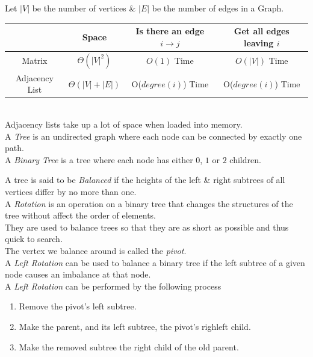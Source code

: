 \documentclass[11pt,a4paper]{article}
\begin{document}
Let $|V|$ be the number of vertices \& $|E|$ be the number of edges in a Graph.\\
\begin{tabular}{|c|c|c|c|}
\hline
&Space&Is there an edge $i\to j$&Get all edges leaving $i$\\
\hline
Matrix&$\Theta(|V|^2)$&$O(1)$ Time& $O(|V|)$ Time\\
Adjacency List&$\Theta(|V|+|E|)$& O($degree(i)$) Time& O($degree(i)$) Time\\
\hline
\end{tabular}\\
\nb Adjacency lists take up a lot of space when loaded into memory.\\

A \textit{Tree} is an undirected graph where each node can be connected by exactly one path.\\

A \textit{Binary Tree} is a tree where each node has either $0$, $1$ or $2$ children.\\


A tree is said to be \textit{Balanced} if the heights of the left \& right subtrees of all vertices differ by no more than one.\\

A \textit{Rotation} is an operation on a binary tree that changes the structures of the tree without affect the order of elements.\\
They are used to balance trees so that they are as short as possible and thus quick to search.\\
\nb The vertex we balance around is called the \textit{pivot}.\\

A \textit{Left Rotation} can be used to balance a binary tree if the left subtree of a given node causes an imbalance at that node.\\
A \textit{Left Rotation} can be performed by the following process
\begin{enumerate}
	\item Remove the pivot's left subtree.
	\item Make the parent, and its left subtree, the pivot's righleft child.
	\item Make the removed subtree the right child of the old parent.
\end{enumerate}
\end{document}
